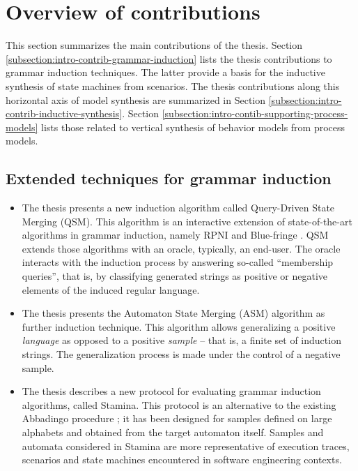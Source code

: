 \section{Overview of contributions\label{section:intro-contributions}}

This section summarizes the main contributions of the thesis. Section \ref{subsection:intro-contrib-grammar-induction} lists the thesis contributions to grammar induction techniques. The latter provide a basis for the inductive synthesis of state machines from scenarios. The thesis contributions along this horizontal axis of model synthesis are summarized in Section \ref{subsection:intro-contrib-inductive-synthesis}. Section \ref{subsection:intro-contib-supporting-process-models} lists those related to vertical synthesis of behavior models from process models.


\subsection{Extended techniques for grammar induction\label{subsection:intro-contrib-grammar-induction}}

\begin{itemize}
\item The thesis presents a new induction algorithm called Query-Driven State Merging (QSM). This algorithm is an interactive extension of state-of-the-art algorithms in grammar induction, namely RPNI and Blue-fringe \cite{Oncina:1992, Lang:1998}. QSM extends those algorithms with an oracle, typically, an end-user. The oracle interacts with the induction process by answering so-called ``membership queries'', that is, by classifying generated strings as positive or negative elements of the induced regular language.
\item The thesis presents the Automaton State Merging (ASM) algorithm as further induction technique. This algorithm allows generalizing a positive \emph{language} as opposed to a positive \emph{sample} -- that is, a finite set of induction strings. The generalization process is made under the control of a negative sample.
\item The thesis describes a new protocol for evaluating grammar induction algorithms, called Stamina. This protocol is an alternative to the existing Abbadingo procedure \cite{Lang:1998}; it has been designed for samples defined on large alphabets and obtained from the target automaton itself. Samples and automata considered in Stamina are more representative of execution traces, scenarios and state machines encountered in software engineering contexts.
\end{itemize}

